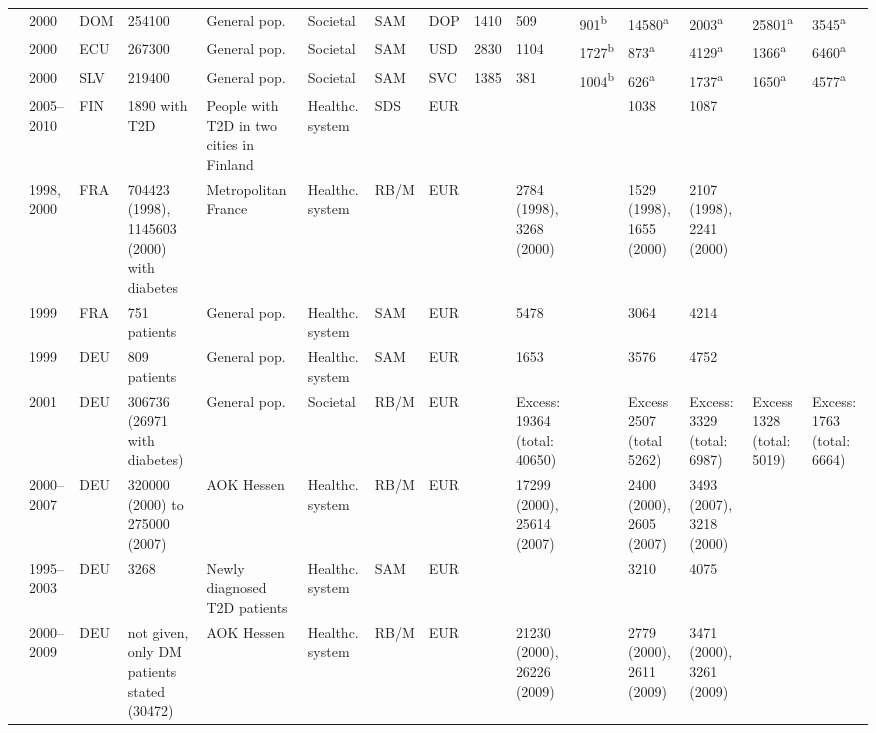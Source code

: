 {\begin{landscape}
\begin{tabularx}{\linewidth}{Z X X Z Z X X X X X X X X Y Y}
\textcite{Barcelo2003} & 2000 & DOM & 254100 & General pop. & Societal & SAM & DOP & 1410 & 509 & 901\textsuperscript{b} & 14580\textsuperscript{a} & 2003\textsuperscript{a} & 25801\textsuperscript{a} & 3545\textsuperscript{a} \\
\textcite{Barcelo2003} & 2000 & ECU & 267300 & General pop. & Societal & SAM & USD & 2830 & 1104 & 1727\textsuperscript{b} & 873\textsuperscript{a} & 4129\textsuperscript{a} & 1366\textsuperscript{a} & 6460\textsuperscript{a} \\
\textcite{Barcelo2003} & 2000 & SLV & 219400 & General pop. & Societal & SAM & SVC & 1385 & 381 & 1004\textsuperscript{b} & 626\textsuperscript{a} & 1737\textsuperscript{a} & 1650\textsuperscript{a} & 4577\textsuperscript{a} \\
\textcite{Honkasalo2014} & 2005--2010 & FIN & 1890 with T2D & People with T2D in two cities in Finland & Healthc. system & SDS & EUR &  &  &  & 1038 & 1087 &  &  \\
\textcite{Ricordeau2003} & 1998, 2000 & FRA & 704423 (1998), 1145603 (2000) with diabetes & Metropolitan France & Healthc. system & RB/M & EUR &  & 2784 (1998), 3268 (2000) &  & 1529    (1998), 1655 (2000) & 2107 (1998), 2241 (2000) &  &  \\
\textcite{Jonsson2002b} & 1999 & FRA & 751 patients & General pop. & Healthc. system & SAM & EUR &  & 5478 &  & 3064 & 4214 &  &  \\
\textcite{Jonsson2002b} & 1999 & DEU & 809 patients & General pop. & Healthc. system & SAM & EUR &  & 1653 &  & 3576 & 4752 &  &  \\
\textcite{Koster2006c} & 2001 & DEU & 306736 (26971 with diabetes) & General pop. & Societal & RB/M & EUR &  & Excess: 19364  (total: 40650) &  & Excess 2507 (total 5262) & Excess: 3329 (total: 6987) & Excess 1328 (total: 5019) & Excess: 1763 (total: 6664) \\
\textcite{Koster2011c} & 2000--2007 & DEU & 320000 (2000) to 275000 (2007) & AOK Hessen & Healthc. system & RB/M & EUR &  & 17299 (2000),   25614 (2007) &  & 2400 (2000),   2605 (2007) & 3493 (2007), 3218 (2000) &  &  \\
\textcite{Martin2007b} & 1995--2003 & DEU & 3268 & Newly diagnosed T2D patients & Healthc. system & SAM & EUR &  &  &  & 3210 & 4075 &  &  \\
\textcite{Koster2012} & 2000--2009 & DEU & not given, only DM patients stated (30472) & AOK Hessen & Healthc. system & RB/M & EUR &  & 21230 (2000), 26226 (2009) &  & 2779 (2000), 2611 (2009) & 3471 (2000), 3261 (2009) &  &  \\

\end{tabularx}
\end{landscape}}
